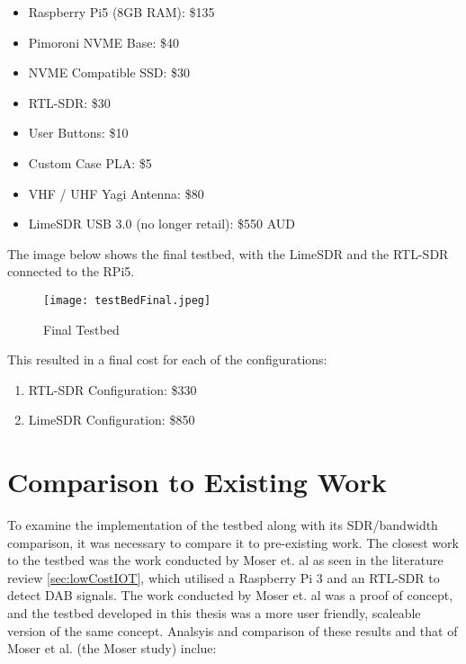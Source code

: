 \begin{multicols}{2}
    \begin{itemize}
        \item Raspberry Pi5 (8GB RAM): \$135 \cite{core_electronics_rpi5}
        \item Pimoroni NVME Base: \$40 \cite{pimoroni_nvme_base}
        \item NVME Compatible SSD: \$30 
        \item RTL-SDR: \$30 \cite{RTLSDRchipSet}
        \item User Buttons: \$10
        \item Custom Case PLA: \$5 
        \item VHF / UHF Yagi Antenna: \$80 \cite{AntennaPiece}
        \item LimeSDR USB 3.0 (no longer retail): \$550 AUD \cite{limesdr_usb}
    \end{itemize}
\end{multicols}

The image below shows the final testbed, with the LimeSDR and the RTL-SDR connected to the RPi5.

\begin{figure}[h!]
    \centering
    \texttt{[image: testBedFinal.jpeg]}
    \caption{Final Testbed}
    \label{fig:finalTestbed}
\end{figure}

This resulted in a final cost for each of the configurations:
\begin{enumerate}
    \item RTL-SDR Configuration: \$330
    \item LimeSDR Configuration: \$850
\end{enumerate}


\section{Comparison to Existing Work}
To examine the implementation of the testbed along with its SDR/bandwidth comparison, it was necessary to compare it to pre-existing work. The closest work to the testbed was the work conducted by Moser et. al \cite{IOTpassiveRadar} as seen in the literature review \ref{sec:lowCostIOT}, which utilised a Raspberry Pi 3 and an RTL-SDR to detect DAB signals. The work conducted by Moser et. al was a proof of concept, and the testbed developed in this thesis was a more user friendly, scaleable version of the same concept. Analsyis and comparison of these results and that of Moser et al. (the Moser study) inclue:

